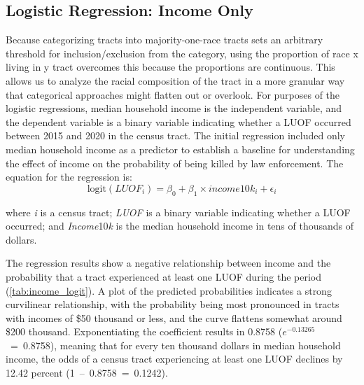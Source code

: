 \documentclass[12pt]{article}
\begin{document}
\subsection{Logistic Regression: Income Only}

Because categorizing tracts into majority-one-race tracts sets an arbitrary threshold for inclusion/exclusion from the category, using the proportion of race x living in y tract overcomes this because the proportions are continuous. This allows us to analyze the racial composition of the tract in a more granular way that categorical approaches might flatten out or overlook. For purposes of the logistic regressions, median household income is the independent variable, and the dependent variable is a binary variable indicating whether a LUOF occurred between 2015 and 2020 in the census tract. The initial regression included only median household income as a predictor to establish a baseline for understanding the effect of income on the probability of being killed by law enforcement. The equation for the regression is:
\begin{equation}
\text{logit}(LUOF_{i})=\beta_{0} + \beta_{1} \times income10k_{i} + \epsilon_{i}
\end{equation}

\noindent{}where \textit{i} is a census tract; \textit{LUOF} is a binary variable indicating whether a LUOF occurred; and \textit{Income}10\textit{k} is the median household income in tens of thousands of dollars.

The regression results show a negative relationship between income and the probability that a tract experienced at least one LUOF during the period (\autoref{tab:income_logit}). A plot of the predicted probabilities indicates a strong curvilinear relationship, with the probability being most pronounced in tracts with incomes of \$50 thousand or less, and the curve flattens somewhat around \$200 thousand. Exponentiating the coefficient results in 0.8758 ($e^{-0.13265}$~=~0.8758), meaning that for every ten thousand dollars in median household income, the odds of a census tract experiencing at least one LUOF declines by 12.42 percent (1~--~0.8758~=~0.1242).
\end{document}
